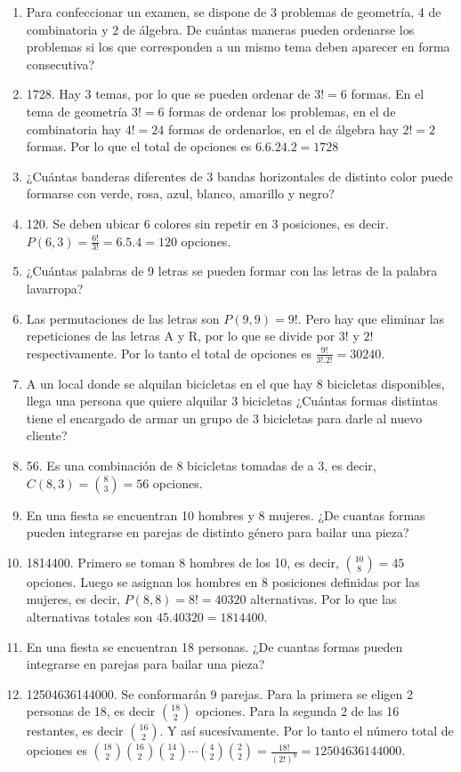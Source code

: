 \documentclass[a4paper]{article}
\newcommand{\answer}{\item[**]}
\begin{document}
\begin{enumerate}
\begin{enumerate} [label=(\alph*)]
		\item Para confeccionar un examen, se dispone de 3 problemas de geometría, 4 de combinatoria y 2 de álgebra. De cuántas maneras pueden ordenarse los problemas si los que corresponden a un mismo tema deben aparecer en forma consecutiva?
		\answer 1728. Hay 3 temas, por lo que se pueden ordenar de $3! = 6$ formas. En el tema de geometría $3! = 6$ formas de ordenar los problemas, en el de combinatoria hay $4!=24$ formas de ordenarlos, en el de álgebra hay $2!=2$ formas. Por lo que el total de opciones es $6.6.24.2 = 1728$

		\item ¿Cuántas banderas diferentes de 3 bandas horizontales de distinto color puede formarse con verde, rosa, azul, blanco, amarillo y negro?
		\answer 120. Se deben ubicar 6 colores sin repetir en 3 posiciones, es decir. $P(6,3)=\frac{6!}{3!}=6.5.4=120$ opciones.

		\item ¿Cuántas palabras de 9 letras se pueden formar con las letras de la palabra lavarropa?
		\answer Las permutaciones de las letras son $P(9,9)=9!$. Pero hay que eliminar las repeticiones de las letras A y R, por lo que se divide por $3!$ y $2!$ respectivamente. Por lo tanto el total de opciones es $\frac{9!}{3!.2!}=30240$.

		\item A un local donde se alquilan bicicletas en el que hay 8 bicicletas disponibles, llega una persona que quiere alquilar 3 bicicletas ¿Cuántas formas distintas tiene el encargado de armar un grupo de 3 bicicletas para darle al nuevo cliente?
		\answer 56. Es una combinación de 8 bicicletas tomadas de a 3, es decir, $C(8,3)=\binom{8}{3}=56$ opciones.

		\item En una fiesta se encuentran 10 hombres y 8 mujeres. ¿De cuantas formas pueden integrarse en parejas de distinto género para bailar una pieza?
		\answer 1814400. Primero se toman 8 hombres de los 10, es decir, $\binom{10}{8}=45$ opciones. Luego se asignan los hombres en 8 posiciones definidas por las mujeres, es decir, $P(8,8)=8!=40320$ alternativas. Por lo que las alternativas totales son $45.40320=1814400$.

		\item En una fiesta se encuentran 18 personas. ¿De cuantas formas pueden integrarse en parejas para bailar una pieza?
		\answer 12504636144000. Se conformarán 9 parejas. Para la primera se eligen 2 personas de 18, es decir $\binom{18}{2}$ opciones. Para la segunda 2 de las 16 restantes, es decir $\binom{16}{2}$. Y así sucesívamente. Por lo tanto el número total de opciones es $\binom{18}{2}\binom{16}{2}\binom{14}{2} \cdots \binom{4}{2}\binom{2}{2}=\frac{18!}{(2!)^9}=12504636144000$.


\end{enumerate}
\end{enumerate}
\end{document}
